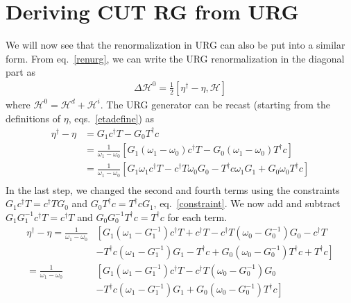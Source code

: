 \documentclass[twoside,11pt]{report}
\numberwithin{equation}{section}
\begin{document}
\section{Deriving CUT RG from URG}
We will now see that the renormalization in URG can also be put into a similar form. From eq.~\ref{renurg}, we can write the URG renormalization in the diagonal part as
\begin{equation}\begin{aligned}
	\Delta \mathcal{H}^0 = \frac{1}{2}\left[\eta^\dagger - \eta,\mathcal{H}\right]
\end{aligned}\end{equation}
where \(\mathcal{H}^0 = \mathcal{H}^d + \mathcal{H}^i\). The URG generator can be recast (starting from the definitions of \(\eta\), eqs.~\ref{etadefine}) as
\begin{equation}\begin{aligned}
\eta^\dagger - \eta &= G_1 c^\dagger T - G_0 T^\dagger c\\
		    &= \frac{1}{\omega_1 - \omega_0}\left[G_1 \left(\omega_1 - \omega_0\right)c^\dagger T - G_0 \left(\omega_1 - \omega_0\right)T^\dagger c\right]\\
		    &= \frac{1}{\omega_1 - \omega_0}\left[G_1 \omega_1 c^\dagger T - c^\dagger T\omega_0G_0 - T^\dagger c \omega_1 G_1 +  G_0\omega_0T^\dagger c\right]\\
\end{aligned}\end{equation}
In the last step, we changed the second and fourth terms using the constraints \(G_1 c^\dagger T = c^\dagger T G_0\) and \(G_0 T^\dagger c = T^\dagger c G_1\), eq.~\ref{constraint}. We now add and subtract \(G_1 G_1^{-1}c^\dagger T = c^\dagger T\) and \(G_0 G_0^{-1}T^\dagger c = T^\dagger c\) for each term.
\begin{equation}\begin{aligned}
	\eta^\dagger - \eta = \frac{1}{\omega_1 - \omega_0}&\left[G_1 \left(\omega_1 - G_1^{-1}\right)c^\dagger T + c^\dagger T - c^\dagger T \left(\omega_0 - G_0^{-1}\right) G_0 - c^\dagger T \right.\\
							   &\left.-  T^\dagger c\left(\omega_1 - G_1^{-1}\right)G_1 - T^\dagger c +  G_0\left(\omega_0 - G_0^{-1}\right)T^\dagger c + T^\dagger c\right]\\
	= \frac{1}{\omega_1 - \omega_0}&\left[G_1 \left(\omega_1 - G_1^{-1}\right)c^\dagger T - c^\dagger T \left(\omega_0 - G_0^{-1}\right) G_0 \right.\\
				       &\left.-  T^\dagger c\left(\omega_1 - G_1^{-1}\right)G_1 +  G_0\left(\omega_0 - G_0^{-1}\right)T^\dagger c\right]\\
\end{aligned}\end{equation}
\end{document}
